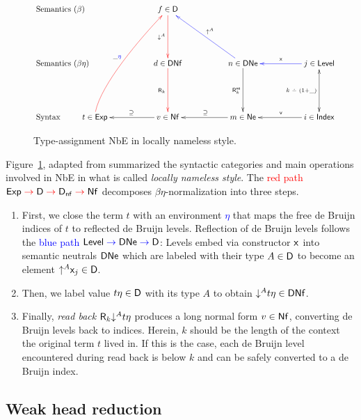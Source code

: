 \documentclass[acmsmall%
]{acmart}\settopmatter{printfolios=true}
\begin{document}
\begin{figure}
\hrulefill
$$
\xymatrix@R=12ex@C=12ex{
\mathrlap{\mbox{Semantics ($\beta$)}} &
  &                f \in \D   \ar@[red][d]_{\down A}
\\
\mathrlap{\mbox{Semantics ($\beta\eta$)}} &
  &                d \in \DNf \ar@[red][d]_{\tR_k{}}
  &                n \in \DNe \ar[d]_{\tRne_k} \ar@[blue][ul]_{\up A}
  & \ar@[blue][l]_{\var{}} j \in \Level \ar@{<->}[d]_{k\dotminus(1+\_)}
\\
\mathrlap{\mbox{Syntax}} &
t \in \Exp \ar@[red]@(u,dl)[uur]^{\_\color{blue}\eta} %
  & \ar[l]_{\supseteq}  v \in \Nf
  & \ar[l]_{\supseteq}  m \in \Ne
  & \ar[l]_{\ind{}}     i \in \Index
  &
}
$$
\hrulefill
\caption{Type-assignment NbE in locally nameless
    style.\label{fig:typedchart}}
\end{figure}

\newcommand{\redto}{\mathrel{\color{red}{\to}}}
\newcommand{\blueto}{\mathrel{\color{blue}{\to}}}

Figure~\ref{fig:typedchart}, adapted from \citet{abel:habil} summarized the syntactic categories and main operations involved in NbE in what is called \emph{locally nameless style}.  The \textcolor{red}{red path} $\Exp \redto \D \redto \Dnf \redto \Nf$ decomposes $\beta\eta$-normalization into three steps.
\begin{enumerate}
\item
First, we close the term $t$ with an environment \textcolor{blue}{$\eta$} that maps the
free de Bruijn indices of $t$ to reflected de Bruijn levels.
Reflection of de Bruijn levels follows the \textcolor{blue}{blue path}
$\Level \blueto \DNe \blueto \D$: Levels embed via constructor $\mathsf{x}_{}$
into semantic neutrals $\mathsf{DNe}$ which are labeled with their type $A \in \mathsf{D}$
to become an element $\mathord{\uparrow^{A}} \mathsf{x}_{j} \in \mathsf{D}$.

\item
Then, we label value $t \eta \in \mathsf{D}$ with its type $A$ to obtain $\mathord{\downarrow^{A}} t \eta \in \mathsf{DNf}$.
\item
Finally, \emph{read back} %
$\mathsf{R}_k \mathord{\downarrow^{A}} t\eta$ produces a long normal form $v \in \mathsf{Nf}$, converting de Bruijn levels back to indices.
Herein, $k$ should be the length of the context the original term $t$ lived in.
If this is the case, each de Bruijn level encountered during read back is below $k$ and can be safely converted to a de Bruijn index.
\end{enumerate}

\subsection{Weak head reduction}
\end{document}
